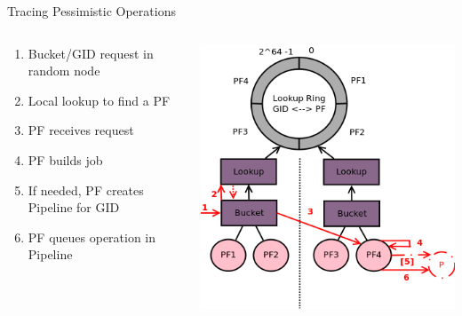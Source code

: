 \documentclass[aspectratio=169]{beamer}
\begin{document}
\begin{frame}{Tracing Pessimistic Operations}
    \begin{columns}
        \begin{column}[c]{0.5\textwidth}
            \begin{enumerate}
                \item Bucket/GID request in random node
                \item Local lookup to find a PF
                \item PF receives request
                \item PF builds job
                \item If needed, PF creates Pipeline for GID
                \item PF queues operation in Pipeline
            \end{enumerate}
        \end{column}
        \begin{column}[c]{0.5\textwidth}
            \includegraphics[width=\textwidth]{images/tracingpessimistic.png}
        \end{column}
    \end{columns}
\end{frame}
\end{document}
